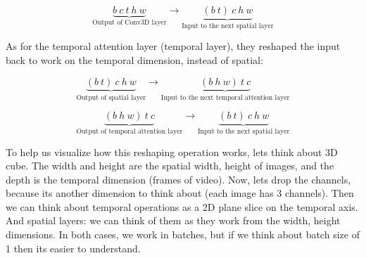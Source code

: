 \[ \underbrace{b\ c\ t\ h\ w}_{\text{Output of Conv3D layer}} \rightarrow \underbrace{(b\ t)\ c\ h\ w}_{\text{Input to the next spatial layer}} \]

As for the temporal attention layer (temporal layer), they reshaped the input back to work on the temporal dimension, instead of spatial:

\[ \underbrace{(b\ t)\ c\ h\ w}_{\text{Output of spatial layer}} \rightarrow \underbrace{(b\ h\ w) \ t\ c}_{\text{Input to the next temporal attention layer}} \]

\[ \underbrace{(b\ h\ w) \ t\ c}_{\text{Output of temporal attention layer}} \rightarrow \underbrace{(b\ t)\ c\ h\ w}_{\text{Input to the next spatial layer}} \]

To help us visualize how this reshaping operation works, lets think about 3D cube. The width and height are the spatial width, height of images, and the depth is the temporal dimension (frames of video). Now, lets drop the channels, because its another dimension to think about (each image has 3 channels). Then we can think about temporal operations as a 2D plane slice on the temporal axis. And spatial layers: we can think of them as they work from the width, height dimensions. In both cases, we work in batches, but if we think about batch size of 1 then its easier to understand.


